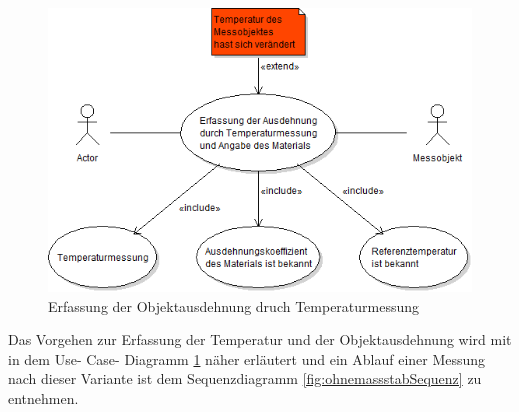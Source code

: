 \begin{figure}[h]
	\label{fig:ausdehnungtemperatur}
	\centering
		\includegraphics[scale=0.5]{UMLDiagramme/erfassungAusdehnungTemperaturUML}
	\caption{Erfassung der Objektausdehnung druch Temperaturmessung}
\end{figure}

Das Vorgehen zur Erfassung der Temperatur und der Objektausdehnung wird mit in dem Use- Case- Diagramm \ref{fig:ausdehnungtemperatur} näher erläutert und ein Ablauf einer Messung nach dieser Variante ist dem Sequenzdiagramm \ref{fig:ohnemassstabSequenz} zu entnehmen.

